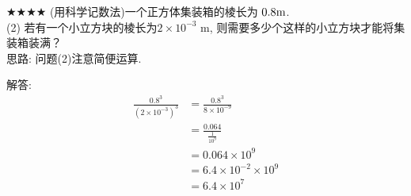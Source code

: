 \item {
    $\bigstar\bigstar\bigstar\bigstar$
    (用科学记数法)一个正方体集装箱的棱长为 $0. 8 \rm{m}$. \\
    (2) 若有一个小立方块的棱长为$2\times 10^{-3} $ m, 则需要多少个这样的小立方块才能将集装箱装满？
    \ifshowSolution
    \fangsong{}
    \\
    思路: 问题(2)注意简便运算. 

    解答:
    \begin{align*}
        \frac{0. 8^3} {(2\times 10^{-3})^3} &= \frac{0. 8^3} {8\times 10^{-9}}\\
        &= \frac{0. 064} {\frac{1}{10^9}}\\
        &= 0. 064\times 10^9\\
        &= 6. 4\times 10^{-2}\times 10^9\\
        &= 6. 4\times 10^7\\
    \end{align*}
    \else
        \\ \\ \\
    \fi
}

\begin{comment}
    \item {
        (把 $\frac{1}{27}$ 化为以3为底的幂) 若$3^{x-1}=\frac{1}{27}$, 求$x$. 
        \\ \\ \\
    }
\end{comment}
    
\begin{comment}
\item {
    (注意: 除号使用分数形式) 已知$a^{2n}=3, a^{3m}=5$, 求$a^{6n-9m}$. 
    \ifshowSolution
    \fangsong\zihao{4}
    \\
    思路: 将$a^{6n-9m}$凑出$a^{2n}, a^{3m}$, 直接代入计算. 结果使用分数形式即可. 

    解答: 
    \begin{align*}
        a^{6n-9m} &= \frac{a^{6n}}{a^{9m}}\\
        &= \frac{(a^{2n})^3} {(a^{3m})^3}\\
        &= \frac{3^3} {5^3}\\
        &= \frac{27} {125}. 
    \end{align*}
    \else
        \\ \\ \\
    \fi
}
\end{comment}

